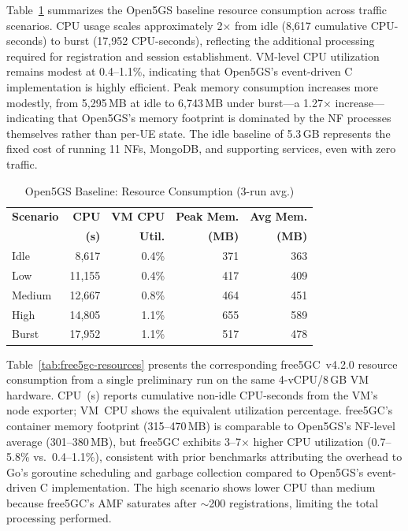 \documentclass[conference]{IEEEtran}
\begin{document}
Table~\ref{tab:open5gs-resources} summarizes the Open5GS baseline resource consumption across traffic scenarios. CPU usage scales approximately 2$\times$ from idle (8,617 cumulative CPU-seconds) to burst (17,952 CPU-seconds), reflecting the additional processing required for registration and session establishment. VM-level CPU utilization remains modest at 0.4--1.1\%, indicating that Open5GS's event-driven C implementation is highly efficient. Peak memory consumption increases more modestly, from 5,295\,MB at idle to 6,743\,MB under burst---a 1.27$\times$ increase---indicating that Open5GS's memory footprint is dominated by the NF processes themselves rather than per-UE state. The idle baseline of 5.3\,GB represents the fixed cost of running 11 NFs, MongoDB, and supporting services, even with zero traffic.

\begin{table}[t]
  \centering
  \caption{Open5GS Baseline: Resource Consumption (3-run avg.)}
  \label{tab:open5gs-resources}
  \footnotesize
  \begin{tabular}{@{}lrr rr@{}}
  \toprule
  \textbf{Scenario} & \textbf{CPU} & \textbf{VM CPU} & \textbf{Peak Mem.} & \textbf{Avg Mem.} \\
   & \textbf{(s)} & \textbf{Util.} & \textbf{(MB)} & \textbf{(MB)} \\
  \midrule
  Idle      & 8,617   & 0.4\%  & 371  & 363 \\
  Low       & 11,155  & 0.4\%  & 417  & 409 \\
  Medium    & 12,667  & 0.8\%  & 464  & 451 \\
  High      & 14,805  & 1.1\%  & 655  & 589 \\
  Burst     & 17,952  & 1.1\%  & 517  & 478 \\
  \bottomrule
  \end{tabular}
  \end{table}


Table~\ref{tab:free5gc-resources} presents the corresponding free5GC~v4.2.0 resource consumption from a single preliminary run on the same 4-vCPU/8\,GB VM hardware. CPU~(s) reports cumulative non-idle CPU-seconds from the VM's node exporter; VM~CPU shows the equivalent utilization percentage. free5GC's container memory footprint (315--470\,MB) is comparable to Open5GS's NF-level average (301--380\,MB), but free5GC exhibits 3--7$\times$ higher CPU utilization (0.7--5.8\% vs.\ 0.4--1.1\%), consistent with prior benchmarks attributing the overhead to Go's goroutine scheduling and garbage collection compared to Open5GS's event-driven C implementation. The high scenario shows lower CPU than medium because free5GC's AMF saturates after $\sim$200 registrations, limiting the total processing performed.
\end{document}
